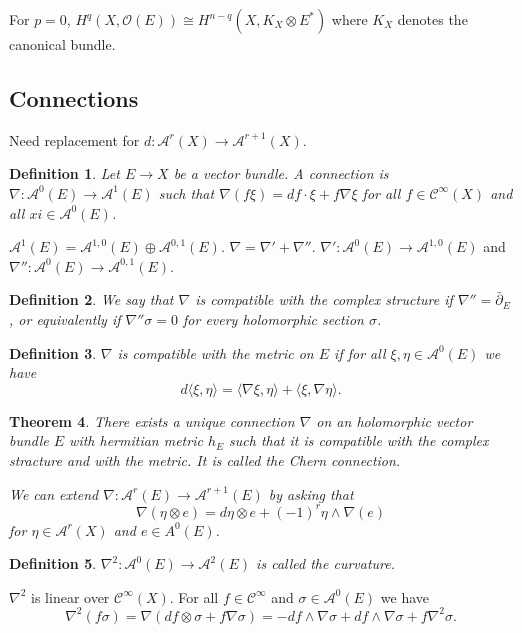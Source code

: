 \documentclass[12pt]{article}
\theoremstyle{darkgreentheorem}
\newtheorem{thm}{Theorem}
\theoremstyle{darkbluedefinition}
\newtheorem{defn}[thm]{Definition}
\theoremstyle{darkredexample}
\theoremstyle{remark}
\newcommand{\1}{\mathbbm{1}}
\newcommand{\A}{\mathscr{A}}
\newcommand{\calC}{\mathcal{C}}
\renewcommand{\O}{\mathcal{O}}
\newcommand{\ot}{\otimes}
\newcommand{\op}{\oplus}
\begin{document}
For $p=0$, $H^{q}(X,\O(E))\cong H^{n-q}(X,K_{X}\ot E^{*})$ where $K_{X}$ denotes the canonical bundle.

\subsection{Connections}

Need replacement for $d\colon \A^{r}(X)\to \A^{r+1}(X)$.

\begin{defn}
    Let $E\to X$ be a vector bundle.
    A \textit{connection} is $\nabla \colon \A^{0}(E)\to \A^{1}(E)$ such that $\nabla(f\xi)=df\cdot \xi + f\nabla \xi$ for all $f\in \calC^{\infty}(X)$ and all $xi\in \A^{0}(E)$.
\end{defn}

$\A^{1}(E)=\A^{1,0}(E)\op \A^{0,1}(E)$.
$\nabla =\nabla'+ \nabla''$.
$\nabla'\colon \A^{0}(E)\to \A^{1,0}(E)$ and $\nabla''\colon \A^{0}(E)\to \A^{0,1}(E)$.

\begin{defn}
    We say that $\nabla $ is compatible with the complex structure if $\nabla''=\bar{\partial}_{E}$, or equivalently if $\nabla''\sigma=0$ for every holomorphic section $\sigma$.
\end{defn}

\begin{defn}
    $\nabla$ is compatible with the metric on $E$ if for all $\xi,\eta\in \A^{0}(E)$ we have
    \[ d\langle \xi ,\eta \rangle =\langle \nabla \xi ,\eta\rangle + \langle \xi,\nabla\eta \rangle.\]
\end{defn}

\begin{thm}
    There exists a unique connection $\nabla$ on an holomorphic vector bundle $E$ with hermitian metric $h_{E}$ such that it is compatible with the complex stracture and with the metric.
    It is called the \textit{Chern connection}.

    We can extend $\nabla \colon \A^{r}(E)\to \A^{r+1}(E)$ by asking that
    \[ \nabla(\eta\ot e)=d\eta \ot e+(-1)^{r}\eta \wedge \nabla(e) \]
    for $\eta \in \A^{r}(X)$ and $e\in A^{0}(E)$.
\end{thm}

\begin{defn}
    $\nabla^{2}\colon \A^{0}(E)\to \A^{2}(E)$ is called the \textit{curvature}.
\end{defn}

$\nabla^{2}$ is linear over $\calC^{\infty}(X)$.
For all $f\in \calC^{\infty}$ and $\sigma \in \A^{0}(E)$ we have
\[ \nabla^{2}(f\sigma)=\nabla(df\ot \sigma + f\nabla \sigma)=-df\wedge \nabla\sigma +df\wedge \nabla \sigma +f\nabla^{2}\sigma.\]
\end{document}
